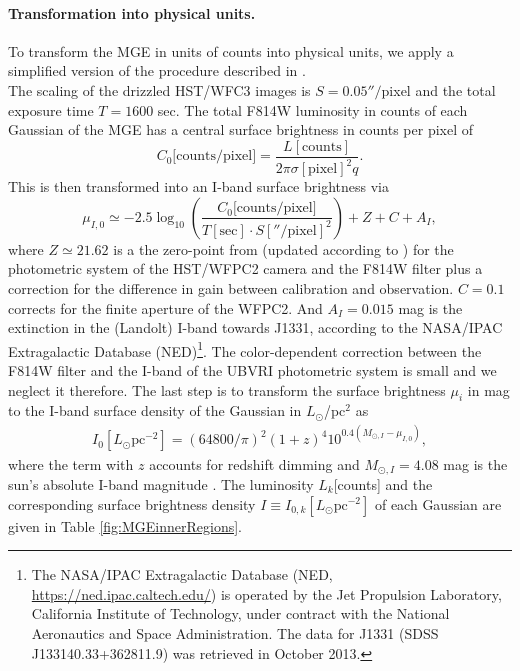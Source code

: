 \paragraph{Transformation into physical units.} To transform the MGE in units of counts into physical units, we apply a simplified version of the procedure described in \citet{Holtzman}.
\\The scaling of the drizzled HST/WFC3 images is  $S = 0.05''/$pixel and the total exposure time $T = 1600$ sec. The total F814W luminosity in counts of each Gaussian of the MGE has a central surface brightness in counts per pixel of
\begin{equation*}
C_0\text{[counts/pixel]} = \frac{L[\text{counts}]}{2\pi \sigma[\text{pixel}]^2 q}.
\end{equation*}
This is then transformed into an I-band surface brightness via
\begin{equation}
\mu_{I,0} \simeq -2.5 \log_{10}\left( \frac{C_0\text{[counts/pixel]}}{T[\text{sec}] \cdot S[''/\text{pixel}]^2}\right) + Z + C + A_I, \label{eq:muI_}
\end{equation}
 where $Z\simeq21.62$ is a the zero-point from \citet{Holtzman}  (updated according to \citet{Dolphin,DolphinNew}) for the photometric system of the HST/WFPC2 camera and the F814W filter plus a correction for the difference in gain between calibration and observation. $C= 0.1$ corrects for the finite aperture of the WFPC2. And $A_I =0.015$ mag  is the extinction in the (Landolt) I-band towards J1331, according to the NASA/IPAC Extragalactic Database (NED)\footnote{The NASA/IPAC Extragalactic Database (NED, \url{https://ned.ipac.caltech.edu/}) is operated by the Jet Propulsion Laboratory, California Institute of Technology, under contract with the National Aeronautics and Space Administration. The data for J1331 (SDSS J133140.33+362811.9) was retrieved in October 2013.}. The color-dependent correction between the F814W filter and the I-band of the UBVRI photometric system is  small \citep{Holtzman} and we neglect it therefore. The last step is to transform the surface brightness $\mu_i$ in mag to the I-band surface density of the Gaussian in $L_\odot$/pc$^2$ as
\begin{eqnarray*}
I_0[L_\odot \text{pc}^{-2}] = \left( 64800/\pi\right)^2 \left(1+z \right)^4 10^{0.4\left(M_{\odot,I}-\mu_{I,0} \right)},
\end{eqnarray*}
where the term with $z$ accounts for redshift dimming and $M_{\odot,I}=4.08$ mag is the sun's absolute I-band magnitude \citep{1998gaas.book.....B}. The luminosity $L_k$[counts] and the corresponding surface brightness density $I \equiv I_{0,k}[L_\odot \text{pc}^{-2}]$ of each Gaussian are given in Table \ref{fig:MGEinnerRegions}. 


